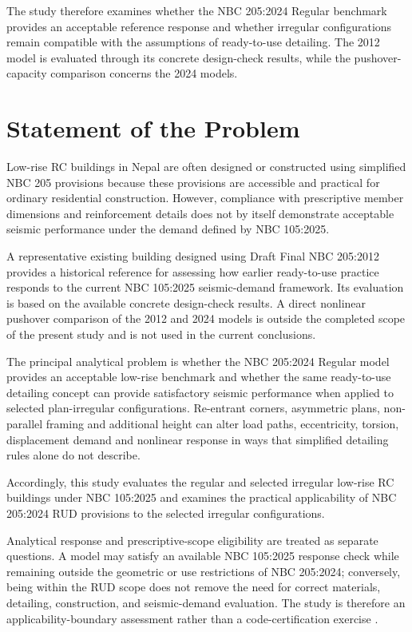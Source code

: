 The study therefore examines whether the NBC 205:2024 Regular benchmark provides an acceptable reference response and whether irregular configurations remain compatible with the assumptions of ready-to-use detailing. The 2012 model is evaluated through its concrete design-check results, while the pushover-capacity comparison concerns the 2024 models.

\section{Statement of the Problem}
Low-rise RC buildings in Nepal are often designed or constructed using simplified NBC 205 provisions because these provisions are accessible and practical for ordinary residential construction. However, compliance with prescriptive member dimensions and reinforcement details does not by itself demonstrate acceptable seismic performance under the demand defined by NBC 105:2025.

A representative existing building designed using Draft Final NBC 205:2012 provides a historical reference for assessing how earlier ready-to-use practice responds to the current NBC 105:2025 seismic-demand framework. Its evaluation is based on the available concrete design-check results. A direct nonlinear pushover comparison of the 2012 and 2024 models is outside the completed scope of the present study and is not used in the current conclusions.

The principal analytical problem is whether the NBC 205:2024 Regular model provides an acceptable low-rise benchmark and whether the same ready-to-use detailing concept can provide satisfactory seismic performance when applied to selected plan-irregular configurations. Re-entrant corners, asymmetric plans, non-parallel framing and additional height can alter load paths, eccentricity, torsion, displacement demand and nonlinear response in ways that simplified detailing rules alone do not describe.

Accordingly, this study evaluates the regular and selected irregular low-rise RC buildings under NBC 105:2025 and examines the practical applicability of NBC 205:2024 RUD provisions to the selected irregular configurations.

Analytical response and prescriptive-scope eligibility are treated as separate questions. A model may satisfy an available NBC 105:2025 response check while remaining outside the geometric or use restrictions of NBC 205:2024; conversely, being within the RUD scope does not remove the need for correct materials, detailing, construction, and seismic-demand evaluation. The study is therefore an applicability-boundary assessment rather than a code-certification exercise \cite{nbc205_2024,nbc105_2025}.

